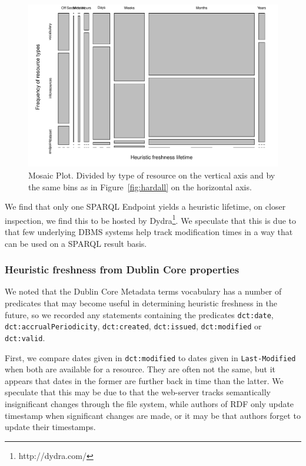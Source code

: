 \documentclass{llncs}
\newcommand{\rdfterm}[1]{\texttt{#1}}
\newcommand{\httph}[1]{\texttt{#1}}
\begin{document}
\begin{figure}[hb!]
  \centerline{%
    \includegraphics[width=.9\textwidth]{heuristictable.pdf}}
  \caption{Mosaic Plot. Divided by type of resource on the vertical
    axis and by the same bins as in Figure~\ref{fig:hardall} on the
    horizontal axis. }
  \label{fig:heuristictable}
\end{figure}


We find that only one SPARQL Endpoint yields a heuristic lifetime, on
closer inspection, we find this to be hosted by
Dydra\footnote{http://dydra.com/}. We speculate that this is due to
that few underlying DBMS systems help track modification times in a
way that can be used on a SPARQL result basis.

\subsubsection{Heuristic freshness from Dublin Core properties}

We noted that the Dublin Core Metadata terms vocabulary has a number
of predicates that may become useful in determining heuristic
freshness in the future, so we recorded any statements containing the
predicates \rdfterm{dct:date}, \rdfterm{dct:accrualPeriodicity},
\rdfterm{dct:created}, \rdfterm{dct:issued}, \rdfterm{dct:modified} or
\rdfterm{dct:valid}.

First, we compare dates given in \rdfterm{dct:modified} to dates given
in \httph{Last-Modified} when both are available for a resource. They
are often not the same, but it appears that dates in the former are
further back in time than the latter. We speculate that this may be
due to that the web-server tracks semantically insignificant changes
through the file system, while authors of RDF only update timestamp
when significant changes are made, or it may be that authors forget to
update their timestamps.
\end{document}
